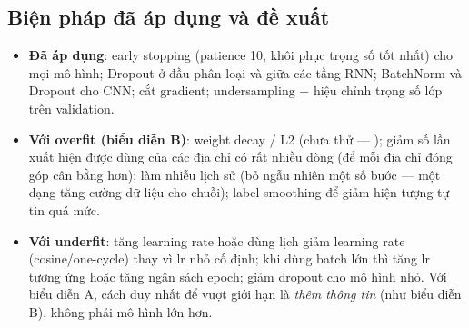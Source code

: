 \subsection{Biện pháp đã áp dụng và đề xuất}
\begin{itemize}
\item \textbf{Đã áp dụng}: early stopping (patience 10, khôi phục trọng số tốt nhất) cho mọi mô hình; Dropout ở đầu phân loại và
  giữa các tầng RNN; BatchNorm và Dropout cho CNN; cắt gradient; undersampling + hiệu chỉnh trọng số lớp trên validation.
\item \textbf{Với overfit (biểu diễn B)}: weight decay / L2 (chưa thử --- ); giảm số lần xuất hiện được dùng
  của các địa chỉ có rất nhiều dòng (để mỗi địa chỉ đóng góp cân bằng hơn); làm nhiễu lịch sử (bỏ ngẫu nhiên một số bước --- một
  dạng tăng cường dữ liệu cho chuỗi); label smoothing để giảm hiện tượng tự tin quá mức.
\item \textbf{Với underfit}: tăng learning rate hoặc dùng lịch giảm learning rate (cosine/one-cycle) thay vì lr nhỏ cố định; khi dùng
  batch lớn thì tăng lr tương ứng hoặc tăng ngân sách epoch; giảm dropout cho mô hình nhỏ. Với biểu diễn A, cách duy nhất để vượt giới
  hạn là \emph{thêm thông tin} (như biểu diễn B), không phải mô hình lớn hơn.
\end{itemize}
